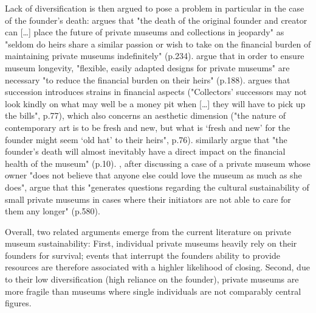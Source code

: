 \documentclass[12pt]{article}
\begin{document}
Lack of diversification is then argued to pose a problem in particular in the case of the founder's death:
\textcite{Walker_2019_collector} argues that "the death of the original founder and creator can [\ldots{}] place the future of private museums and collections in jeopardy" as "seldom do heirs share a similar passion or wish to take on the financial burden of maintaining private museums indefinitely" (p.234). 
\textcite{Bechtler_Imhof_2018_future} argue that in order to ensure museum longevity, "flexible, easily adapted designs for private museums" are necessary "to reduce the financial burden on their heirs" (p.188).
\textcite{Adam_2021_rise} argues that succession introduces strains in financial aspects ("Collectors’ successors may not look kindly on what may well be a money pit when [\ldots{}] they will have to pick up the bills", p.77), which also concerns an aesthetic dimension ("the nature of contemporary art is to be fresh and new, but what is ‘fresh and new’ for the founder might seem ‘old hat’ to their heirs", p.76).
\textcite{Velthuis_Gera_2024_fragility} similarly argue that "the founder’s death will almost inevitably have a direct impact on the financial health of the museum" (p.10).
\textcite{StylianouLambert_etal_2014_museums}, after discussing a case of a private museum whose owner "does not believe that anyone else could love the museum as much as she does", argue that this "generates questions regarding the cultural sustainability of small private museums in cases where their initiators are not able to care for them any longer" (p.580).



Overall, two related arguments emerge from the current literature on private museum sustainability:
First, individual private museums heavily rely on their founders for survival; events that interrupt the founders ability to provide resources are therefore associated with a highler likelihood of closing.
Second, due to their low diversification (high reliance on the founder), private museums are more fragile than museums where single individuals are not comparably central figures.
\end{document}
